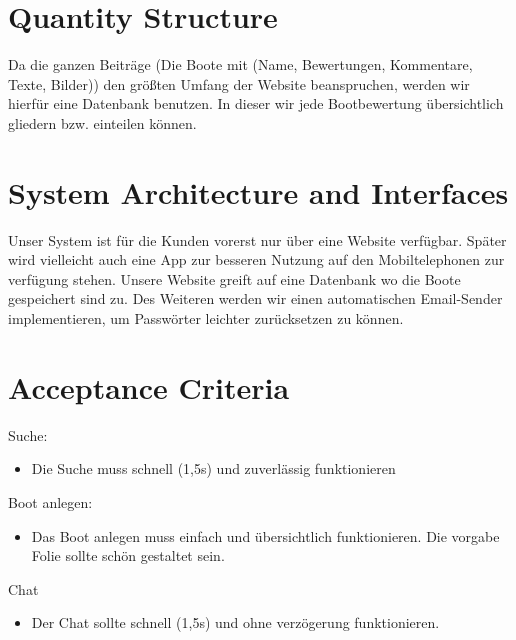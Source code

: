\documentclass[12pt]{article}
\theoremstyle{definition}
\begin{document}
\section{Quantity Structure}
Da die ganzen Beiträge (Die Boote mit (Name, Bewertungen, Kommentare, Texte, Bilder)) den größten Umfang der Website beanspruchen, werden wir hierfür eine Datenbank benutzen. In dieser wir jede Bootbewertung übersichtlich gliedern bzw. einteilen können.

\pagebreak
\section{System Architecture and Interfaces}
Unser System ist für die Kunden vorerst nur über eine Website verfügbar. Später wird vielleicht auch eine App zur besseren Nutzung auf den Mobiltelephonen zur verfügung stehen. Unsere Website greift auf eine Datenbank wo die Boote gespeichert sind zu. Des Weiteren werden wir einen automatischen Email-Sender implementieren, um Passwörter leichter zurücksetzen zu können.

\pagebreak
\section{Acceptance Criteria}
Suche:
\begin{itemize}
	\item Die Suche muss schnell (1,5s) und zuverlässig funktionieren
\end{itemize}
Boot anlegen:
\begin{itemize}
	\item Das Boot anlegen muss einfach und übersichtlich funktionieren. Die vorgabe Folie sollte schön gestaltet sein.
\end{itemize}
Chat
\begin{itemize}
	\item Der Chat sollte schnell (1,5s) und ohne verzögerung funktionieren.
\end{itemize}
\cite{endLine}
{}

\end{document}
